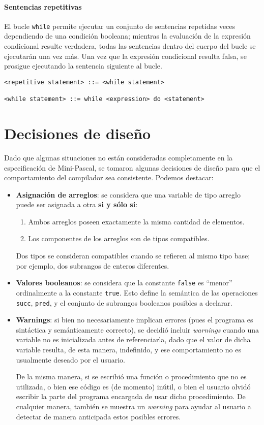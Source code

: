 \documentclass[a4paper,oneside]{report}
\begin{document}
\subsubsection{Sentencias repetitivas}
El bucle \texttt{while} permite ejecutar un conjunto de sentencias repetidas veces dependiendo de una condición booleana; mientras la evaluación de la expresión condicional resulte verdadera, todas las sentencias dentro del cuerpo del bucle se ejecutarán una vez más. Una vez que la expresión condicional resulta falsa, se prosigue ejecutando la sentencia siguiente al bucle.
\begin{verbatim}
<repetitive statement> ::= <while statement>

<while statement> ::= while <expression> do <statement>
\end{verbatim}

\chapter{Decisiones de diseño}

Dado que algunas situaciones no están consideradas completamente en la especificación de Mini-Pascal, se tomaron algunas decisiones de diseño para que el comportamiento del compilador sea consistente. Podemos destacar:

\begin{itemize}
	\item {\bf Asignación de arreglos}: se considera que una variable de tipo arreglo puede ser asignada a otra {\bf si y sólo si}:
		\begin{enumerate}
			\item{Ambos arreglos poseen exactamente la misma cantidad de elementos.}
			\item{Los componentes de los arreglos son de tipos compatibles.}
		\end{enumerate}
		Dos tipos se consideran compatibles cuando se refieren al mismo tipo base; por ejemplo, dos subrangos de enteros diferentes.
	\item {\bf Valores booleanos}: se considera que la constante \texttt{false} es ``menor'' ordinalmente a la constante \texttt{true}. Esto define la semántica de las operaciones \texttt{succ}, \texttt{pred}, y el conjunto de subrangos booleanos posibles a declarar.
	\item {\bf Warnings}: si bien no necesariamente implican errores (pues el programa es sintáctica y semánticamente correcto), se decidió incluir \emph{warnings} cuando una variable no es inicializada antes de referenciarla, dado que el valor de dicha variable resulta, de esta manera, indefinido, y ese comportamiento no es usualmente deseado por el usuario.

	De la misma manera, si se escribió una función o procedimiento que no es utilizada, o bien ese código es (de momento) inútil, o bien el usuario olvidó escribir la parte del programa encargada de usar dicho procedimiento. De cualquier manera, también se muestra un \emph{warning} para ayudar al usuario a detectar de manera anticipada estos posibles errores.
\end{itemize}
\end{document}

